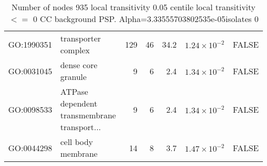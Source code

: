 \begin{table}[ht]
\begin{adjustbox}{max width=\textwidth}
\begin{tabular}{llrrrrl}
  GO:1990351 & transporter complex & 129 & 46 & 34.2 & $1.24 \times 10^{-2}$ & FALSE \\ 
  GO:0031045 & dense core granule & 9 & 6 & 2.4 & $1.34 \times 10^{-2}$ & FALSE \\ 
  GO:0098533 & ATPase dependent transmembrane transport... & 9 & 6 & 2.4 & $1.34 \times 10^{-2}$ & FALSE \\ 
  GO:0044298 & cell body membrane & 14 & 8 & 3.7 & $1.47 \times 10^{-2}$ & FALSE \\ 
   \hline
\end{tabular}
\end{adjustbox}
\caption{Number of nodes 935 local transitivity 0.05 centile  local transitivity $<=$ 0 CC background PSP. Alpha=3.33555703802535e-05isolates 0} 
\label{tab:Number of nodes 935 local transitivity 0.05 centile  local transitivity $<=$ 0 CC background PSP.Alpha=3.33555703802535e-05isolates 0}
\end{table}

